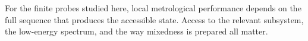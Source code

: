 






For the finite probes studied here, local metrological performance depends on the full sequence that produces the accessible state.  Access to the relevant subsystem, the low-energy spectrum, and the way mixedness is prepared all matter.
